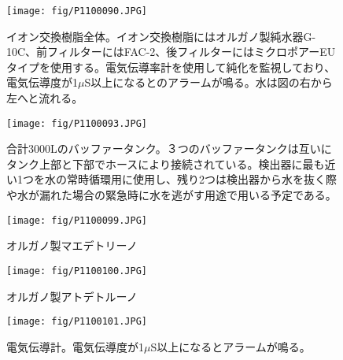 \begin{figure}[htbp]
\begin{minipage}{0.47\textwidth}
\centering
\texttt{[image: fig/P1100090.JPG]}
\caption[イオン交換樹脂]{イオン交換樹脂全体。イオン交換樹脂にはオルガノ製純水器G-10C、前フィルターにはFAC-2、後フィルターにはミクロポアーEUタイプを使用する。電気伝導率計を使用して純化を監視しており、電気伝導度が1$\mu$S以上になるとのアラームが鳴る。水は図の右から左へと流れる。}
\label{IonFilter}
\end{minipage}
\hfil
\begin{minipage}{0.47\textwidth}
\centering
\texttt{[image: fig/P1100093.JPG]}
\caption[バッファータンク]{合計3000Lのバッファータンク。３つのバッファータンクは互いにタンク上部と下部でホースにより接続されている。検出器に最も近い1つを水の常時循環用に使用し、残り2つは検出器から水を抜く際や水が漏れた場合の緊急時に水を逃がす用途で用いる予定である。}
\label{BufferTank}
\end{minipage}
\end{figure}


\begin{figure}[htbp]
\begin{minipage}{0.47\textwidth}
\begin{center}
\texttt{[image: fig/P1100099.JPG]}
\caption[イオン交換樹脂：前フィルター]{オルガノ製マエデトリーノ}
\label{SetPMTTest}
\end{center}
\end{minipage}
\hfill
\begin{minipage}{0.47\textwidth}
\begin{center}
\texttt{[image: fig/P1100100.JPG]}
\caption[イオン交換樹脂：後フィルター]{オルガノ製アトデトルーノ}
\label{SetPMTTest}
\end{center}
\end{minipage}
\end{figure}

\begin{figure}[htbp]
\texttt{[image: fig/P1100101.JPG]}
\caption[電気伝導計]{電気伝導計。電気伝導度が1$\mu$S以上になるとアラームが鳴る。}
\label{SetPMTTest}
\end{figure}
\fi


